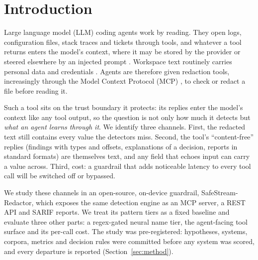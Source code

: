 \section{Introduction}\label{sec:intro}

Large language model (LLM) coding agents work by reading. They open logs, configuration files, stack traces and tickets through tools, and whatever a tool returns enters the model's context, where it may be stored by the provider or steered elsewhere by an injected prompt \cite{greshake2023injection,debenedetti2024agentdojo}. Workspace text routinely carries personal data and credentials \cite{meli2019git}. Agents are therefore given redaction tools, increasingly through the Model Context Protocol (MCP) \cite{mcpspec}, to check or redact a file before reading it.

Such a tool sits on the trust boundary it protects: its replies enter the model's context like any tool output, so the question is not only how much it detects but \emph{what an agent learns through it}. We identify three channels. First, the redacted text still contains every value the detectors miss. Second, the tool's ``content-free'' replies (findings with types and offsets, explanations of a decision, reports in standard formats) are themselves text, and any field that echoes input can carry a value across. Third, cost: a guardrail that adds noticeable latency to every tool call will be switched off or bypassed.

We study these channels in an open-source, on-device guardrail, SafeStream-Redactor, which exposes the same detection engine as an MCP server, a REST API and SARIF reports. We treat its pattern tiers as a fixed baseline and evaluate three other parts: a regex-gated neural name tier, the agent-facing tool surface and its per-call cost. The study was pre-registered: hypotheses, systems, corpora, metrics and decision rules were committed before any system was scored, and every departure is reported (Section~\ref{sec:method}).

